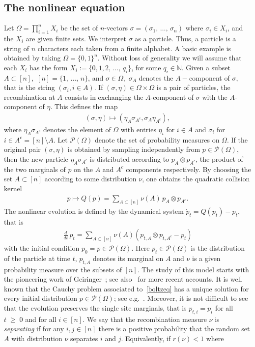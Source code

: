 \documentclass[AHL,Unicode,longabstracts,published]{cedram}
\renewcommand{\geq}{\;\geqslant\;}
\newcommand{\si}{\sigma}
\newcommand{\cP}{\mathcal{P}}
\newcommand{\bbN}{\mathbb{N}}
\let\O=\Omega
\begin{document}
\subsection{The nonlinear equation}\label{setup}
Let $\Omega = \prod_{i=1}^nX_i$ be the set of $n$-vectors $\sigma = (\sigma_1,\,\dots,\,\sigma_n)$ where $\si_i\in X_i$, and the $X_i$ are given finite sets. We interpret $\si$ as a particle. Thus, a particle is a string of $n$ characters each taken from a finite alphabet. A basic example is obtained by taking $\Omega=\{0,1\}^n$. Without loss of generality we will assume that each $X_i$ has the form $X_i :=\{0,1,2,\,\dots,\,q_i\}$, for some $q_i \in \bbN$. Given a subset $A \subset [n],$ $[n]=\{1,\,\dots,\,n\}$, and $\sigma \in \Omega,$ $\sigma_A$ denotes the $A-$component of $\sigma,$ that is the string $(\sigma_i, i \in A).$ If $(\sigma, \eta) \in \Omega \times \Omega$ is a pair of particles, the recombination at $A$ consists in exchanging the $A$-component of $\sigma$ with the $A$-component of $\eta.$ This defines the map
\begin{align*}
(\sigma,\eta) \mapsto (\eta_A\sigma_{A^c},\sigma_A\eta_{A^c}),
\end{align*}
where $\eta_A\sigma_{A^c}$ denotes the element of $\Omega$ with entries $\eta_i$ for $i \in A$ and $\sigma_i$ for $i \in A^c=[n]\setminus A.$ Let $\cP(\O)$ denote the set of probability measures on $\O$. If the original pair $(\si,\eta)$ is obtained by sampling independently from $p\in\cP(\O)$, then the new particle $\eta_A\si_{A^c}$ is distributed according to $p_A\otimes p_{A^c}$, the product of the two marginals of $p$ on the $A$ and $A^c$ components respectively. By choosing the set $A\subset[n]$ according to some distribution $\nu$, one obtains the quadratic collision kernel
\begin{align*}
p\mapsto Q(p) = \sum_{A \subset [n]}\nu(A)\,p_{A}\otimes p_{A^c}.
\end{align*}
The nonlinear evolution is defined by the dynamical system $\dot{p}_t = Q(p_t) - p_t$, that is
\begin{align}\label{boltzeq}
\frac{d}{dt}\,p_t = \sum_{A \subset [n]}\nu(A)\left(p_{t,A}\otimes p_{t,A^c} - p_t\right)
\end{align}
with the initial condition $p_0=p\in\cP(\O)$. Here $p_t\in\cP(\O)$ is the distribution of the particle at time $t$, $p_{t,A}$ denotes its marginal on $A$ and $\nu$ is a given probability measure over the subsets of $[n]$. The study of this model starts with the pioneering work of Geiringer~\cite{Gei}; see also~\cite{Martinez,Sinetal,Sinetal2,Baakeetal} for more recent accounts. It is well known that the Cauchy problem associated to~\eqref{boltzeq} has a unique solution for every initial distribution $p\in\cP(\O)$; see e.g.~\cite{Baakeetal}. Moreover, it is not difficult to see that the evolution preserves the single site marginals, that is $p_{t,i}=p_{i}$ for all $t\geq 0$ and for all $i\in[n]$. We say that the recombination measure $\nu$ is \emph{separating} if for any $i, j \in [n]$ there is a positive probability that the random set $A$ with distribution $\nu$ separates $i$ and $j$. Equivalently, if $r(\nu)<1$ where
\end{document}
